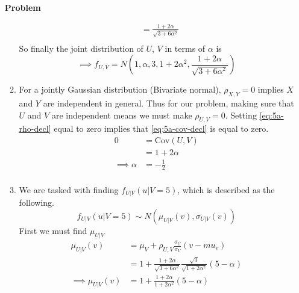 \documentclass[12pt]{article}
\newenvironment{Ex}{\textbf{Problem}\vspace{.75em}\\}{}
\begin{document}
\begin{enumerate}
\begin{Ex}
\begin{solution}
\begin{enumerate}
\begin{equation}
\begin{aligned}
            &= \frac{1 + 2\alpha}{\sqrt{3+6\alpha^2}} \\
          \end{aligned}
        \end{equation}
        So finally the joint distribution of $U$, $V$ in terms of
        $\alpha$ is
        \begin{equation}
          \label{eq:5a-sol}
          \implies f_{U,V} = N(1, \alpha, 3, 1+2\alpha^2, \frac{1 +
            2\alpha}{\sqrt{3+6\alpha^2}})
        \end{equation}
      \item For a jointly Gaussian distribution (Bivariate normal),
        $\rho_{X,Y} = 0$ implies $X$ and $Y$ are independent in
        general. Thus for our problem, making sure that $U$ and $V$
        are independent means we must make $\rho_{U,V} = 0$. Setting
        \cref{eq:5a-rho-decl} equal to zero implies that
        \cref{eq:5a-cov-decl} is equal to zero.
        \begin{equation}
          \label{eq:5b-cov}
          \begin{aligned}
            0 &= \text{Cov}(U,V) \\
            &= 1 + 2 \alpha \\
            \implies \alpha &= -\frac{1}{2} \\
          \end{aligned}
        \end{equation}
      \item We are tasked with finding $f_{U|V}(u|V=5)$, which is
        described as the following.
        \begin{equation}
          \label{eq:5c-presol}
          f_{U|V}(u|V=5) \sim N(\mu_{U|V}(v), \sigma_{U|V}(v))
        \end{equation}
        First we must find $\mu_{U|V}$
        \begin{equation}
          \label{eq:5c-mu-v}
          \begin{aligned}
            \mu_{U|V}(v) &= \mu_V + \rho_{U,V}
            \frac{\sigma_U}{\sigma_V}(v-mu_v) \\
            &= 1 + \frac{1+2\alpha}{\sqrt{3+6\alpha^2}}
            \frac{\sqrt{3}}{\sqrt{1+2\alpha^2}}(5-\alpha)\\
            \implies \mu_{U|V}(v) &= 1 + \frac{1 + 2\alpha}{1 +
              2\alpha^2}(5-\alpha) \\
          \end{aligned}
        \end{equation}

\end{enumerate}
\end{solution}
\end{Ex}
\end{enumerate}
\end{document}
